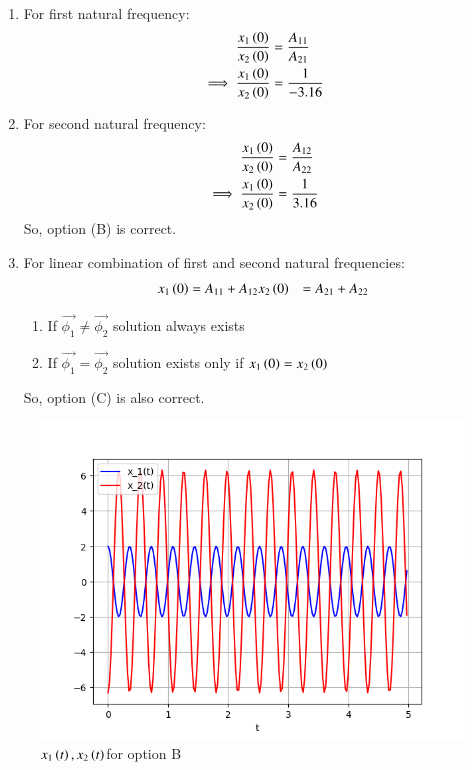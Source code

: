 \documentclass[journal,12pt,twocolumn]{IEEEtran}
\theoremstyle{remark}
\begin{document}
\begin{enumerate}
    \item For first natural frequency: 
    \begin{align}
    \frac{x_1\left(0\right)}{x_2\left(0\right)}&=\frac{A_{11}}{A_{21}}\\
    \implies \frac{x_1\left(0\right)}{x_2\left(0\right)} &= \frac{1}{-3.16}
    \end{align}
    \item For second natural frequency: 
    \begin{align}
    \frac{x_1\left(0\right)}{x_2\left(0\right)}&=\frac{A_{12}}{A_{22}}\\
    \implies \frac{x_1\left(0\right)}{x_2\left(0\right)} &= \frac{1}{3.16}
    \end{align}
    So, option (B) is correct.
    \item For linear combination of first and second natural frequencies:
    \begin{align}
        x_1\left(0\right) &= A_{11}+ A_{12}
        x_2\left(0\right) &= A_{21}+ A_{22}
    \end{align}
    \begin{enumerate}
        \item If $ \vec{\phi_1} \neq \vec{\phi_2}$ solution always exists
        \item If $ \vec{\phi_1} = \vec{\phi_2}$ solution exists only if $ x_1\left(0\right)=x_2\left(0\right)$
    \end{enumerate}
    So, option (C) is also correct.
\end{enumerate}
\begin{figure}[h!]
    \includegraphics[width = \columnwidth]{figs/Figure_1.png}
    \caption{$ x_1\left(t\right), x_2\left(t\right)$for option B}
    \centering
    \label{fig: 2021ae_32_fig_1}
\end{figure}
\end{document}
